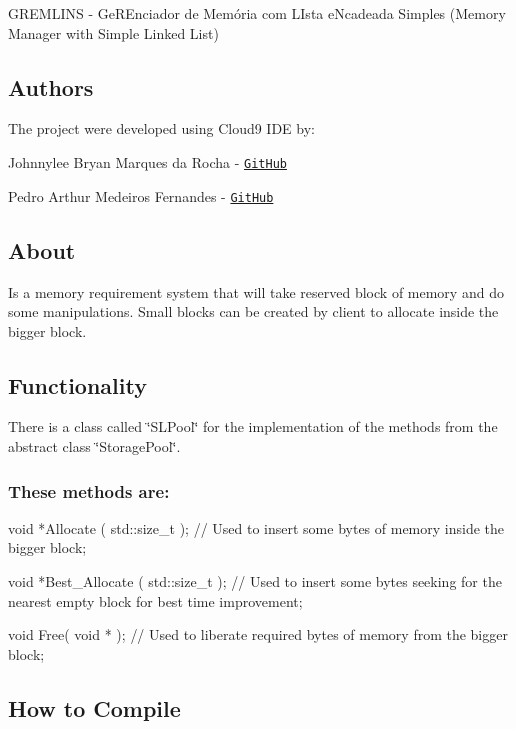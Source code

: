G\+R\+E\+M\+L\+I\+NS -\/ Ge\+R\+Enciador de Memória com L\+Ista e\+Ncadeada Simples (Memory Manager with Simple Linked List)

\subsection*{Authors}

The project were developed using Cloud9 I\+DE by\+:

Johnnylee Bryan Marques da Rocha -\/ \href{https://github.com/kfjohnny2}{\tt Git\+Hub}

Pedro Arthur Medeiros Fernandes -\/ \href{https://github.com/pedroarthur-mf}{\tt Git\+Hub}

\subsection*{About}

Is a memory requirement system that will take reserved block of memory and do some manipulations. Small blocks can be created by client to allocate inside the bigger block.

\subsection*{Functionality}

There is a class called \char`\"{}\+S\+L\+Pool\char`\"{} for the implementation of the methods from the abstract class \char`\"{}\+Storage\+Pool\char`\"{}.

\subsubsection*{These methods are\+:}


\begin{DoxyCode}
\textcolor{keywordtype}{void} *Allocate ( std::size\_t ); \textcolor{comment}{// Used to insert some bytes of memory inside the bigger block;}

\textcolor{keywordtype}{void} *Best\_Allocate ( std::size\_t ); \textcolor{comment}{// Used to insert some bytes seeking for the nearest empty block for
       best time improvement;}

\textcolor{keywordtype}{void} Free( \textcolor{keywordtype}{void} * ); \textcolor{comment}{// Used to liberate required bytes of memory from the bigger block;}
\end{DoxyCode}


\subsection*{How to Compile}

